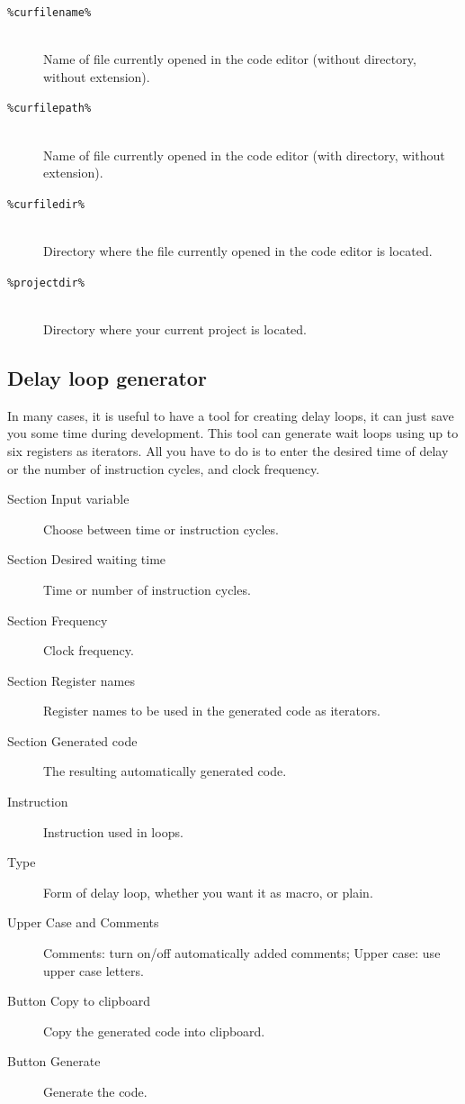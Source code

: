         \begin{description}
            \item[\texttt{\%curfilename\%}]~\\
                Name of file currently opened in the code editor (without directory, without extension).

            \item[\texttt{\%curfilepath\%}]~\\
                Name of file currently opened in the code editor (with directory, without extension).

            \item[\texttt{\%curfiledir\%}]~\\
                Directory where the file currently opened in the code editor is located.

            \item[\texttt{\%projectdir\%}]~\\
                Directory where your current project is located.
        \end{description}

    \clearpage
    \subsection{Delay loop generator}
        In many cases, it is useful to have a tool for creating delay loops, it can just save you some time during         development. This tool can generate wait loops using up to six registers as iterators. All you have to do is to enter the desired time of delay or the number of instruction cycles, and clock frequency.

        \begin{description}
            \item[Section Input variable] Choose between time or instruction cycles.
            \item[Section Desired waiting time] Time or number of instruction cycles.
            \item[Section Frequency] Clock frequency.
            \item[Section Register names] Register names to be used in the generated code as iterators.
            \item[Section Generated code] The resulting automatically generated code.
            \item[Instruction] Instruction used in loops.
            \item[Type] Form of delay loop, whether you want it as macro, or plain.
            \item[Upper Case and Comments] Comments: turn on/off automatically added comments; Upper case: use upper case letters.
            \item[Button Copy to clipboard] Copy the generated code into clipboard.
            \item[Button Generate] Generate the code.
        \end{description}

